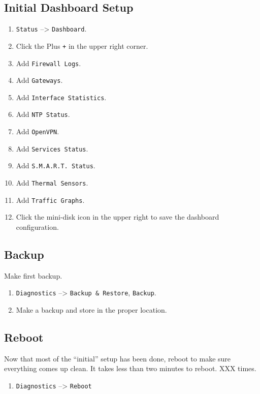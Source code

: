 \subsection{Initial Dashboard Setup}

\begin{enumerate}
 \item \texttt{Status} --> \texttt{Dashboard}.
 \item Click the Plus \texttt{+} in the upper right corner.
 \item Add \texttt{Firewall Logs}.
 \item Add \texttt{Gateways}.
 \item Add \texttt{Interface Statistics}.
 \item Add \texttt{NTP Status}.
 \item Add \texttt{OpenVPN}.
 \item Add \texttt{Services Status}.
 \item Add \texttt{S.M.A.R.T. Status}.
 \item Add \texttt{Thermal Sensors}.
 \item Add \texttt{Traffic Graphs}.
 \item Click the mini-disk icon in the upper right to save the dashboard configuration.
\end{enumerate}

\subsection{Backup}
Make first backup.

\begin{enumerate}
 \item \texttt{Diagnostics} --> \texttt{Backup \& Restore}, \texttt{Backup}.
 \item Make a backup and store in the proper location.
\end{enumerate}

\subsection{Reboot}
Now that most of the ``initial'' setup has been done, reboot to make sure everything comes up clean.
It takes less than two minutes to reboot. XXX times.

\begin{enumerate}
 \item \texttt{Diagnostics} --> \texttt{Reboot}
\end{enumerate}

